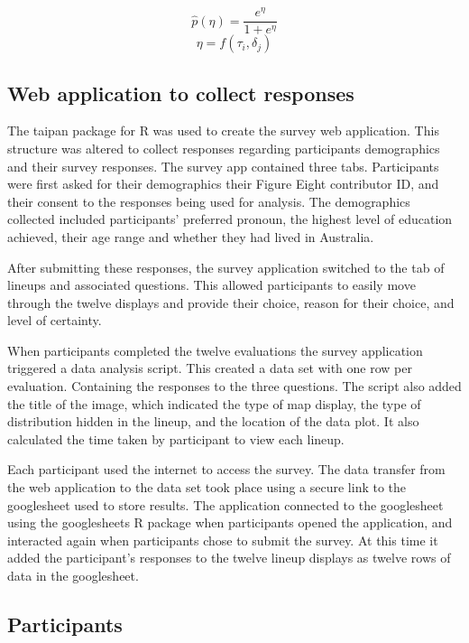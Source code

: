 \documentclass{monashthesis}
\begin{document}
\[\widehat{p}(\eta) = \frac{e^{\eta}}{1 + e^{\eta}}\] \label{eq:transform}
\[\eta = f(\tau_i,\delta_j)\]

\hypertarget{web-application-to-collect-responses}{%
\subsection{Web application to collect responses}\label{web-application-to-collect-responses}}

The taipan \autocite{taipan} package for R was used to create the survey web application.
This structure was altered to collect responses regarding participants demographics and their survey responses.
The survey app contained three tabs. Participants were first asked for their demographics their Figure Eight contributor ID, and their consent to the responses being used for analysis. The demographics collected included participants' preferred pronoun, the highest level of education achieved, their age range and whether they had lived in Australia.

After submitting these responses, the survey application switched to the tab of lineups and associated questions. This allowed participants to easily move through the twelve displays and provide their choice, reason for their choice, and level of certainty.

When participants completed the twelve evaluations the survey application triggered a data analysis script. This created a data set with one row per evaluation. Containing the responses to the three questions. The script also added the title of the image, which indicated the type of map display, the type of distribution hidden in the lineup, and the location of the data plot. It also calculated the time taken by participant to view each lineup.

Each participant used the internet to access the survey.
The data transfer from the web application to the data set took place using a secure link to the googlesheet used to store results. The application connected to the googlesheet using the googlesheets \autocite{sheets} R package when participants opened the application, and interacted again when participants chose to submit the survey. At this time it added the participant's responses to the twelve lineup displays as twelve rows of data in the googlesheet.

\hypertarget{participants}{%
\subsection{Participants}\label{participants}}
\end{document}
